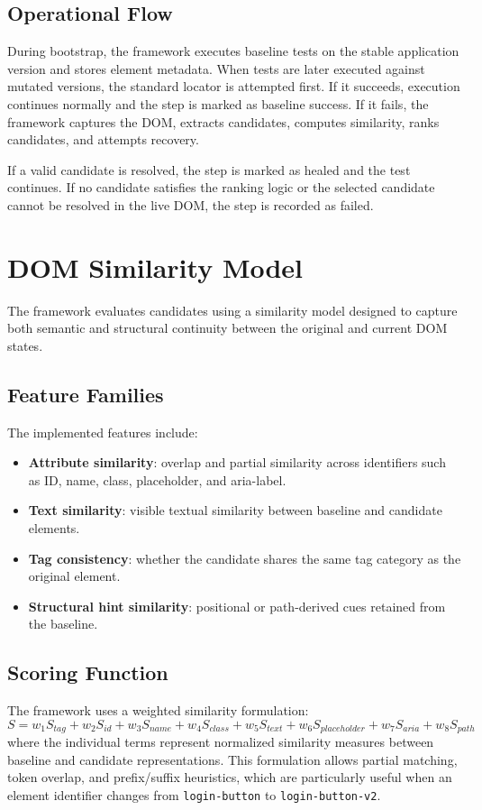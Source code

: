 \documentclass[conference]{IEEEtran}
\begin{document}
\subsection{Operational Flow}
During bootstrap, the framework executes baseline tests on the stable application version and stores element metadata. When tests are later executed against mutated versions, the standard locator is attempted first. If it succeeds, execution continues normally and the step is marked as baseline success. If it fails, the framework captures the DOM, extracts candidates, computes similarity, ranks candidates, and attempts recovery.

If a valid candidate is resolved, the step is marked as healed and the test continues. If no candidate satisfies the ranking logic or the selected candidate cannot be resolved in the live DOM, the step is recorded as failed.

\section{DOM Similarity Model}
The framework evaluates candidates using a similarity model designed to capture both semantic and structural continuity between the original and current DOM states.

\subsection{Feature Families}
The implemented features include:
\begin{itemize}[leftmargin=1.2em]
    \item \textbf{Attribute similarity}: overlap and partial similarity across identifiers such as ID, name, class, placeholder, and aria-label.
    \item \textbf{Text similarity}: visible textual similarity between baseline and candidate elements.
    \item \textbf{Tag consistency}: whether the candidate shares the same tag category as the original element.
    \item \textbf{Structural hint similarity}: positional or path-derived cues retained from the baseline.
\end{itemize}

\subsection{Scoring Function}
The framework uses a weighted similarity formulation:
\[
S = w_1 S_{tag} + w_2 S_{id} + w_3 S_{name} + w_4 S_{class} + w_5 S_{text} + w_6 S_{placeholder} + w_7 S_{aria} + w_8 S_{path}
\]
where the individual terms represent normalized similarity measures between baseline and candidate representations. This formulation allows partial matching, token overlap, and prefix/suffix heuristics, which are particularly useful when an element identifier changes from \texttt{login-button} to \texttt{login-button-v2}.
\end{document}
